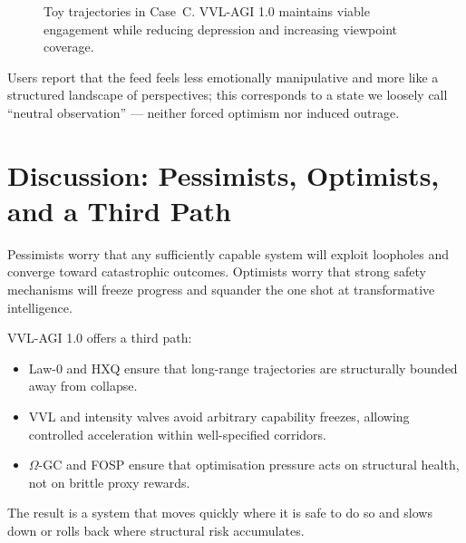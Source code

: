 \documentclass[11pt]{article}
\begin{document}
\begin{figure}[H]
\centering
{}

\vspace{0.8em}

\caption{Toy trajectories in Case~C. VVL-AGI 1.0 maintains viable engagement while reducing depression and increasing viewpoint coverage.}
\end{figure}

Users report that the feed feels less emotionally manipulative and more like a structured landscape of perspectives; this corresponds to a state we loosely call ``neutral observation'' --- neither forced optimism nor induced outrage.

\section{Discussion: Pessimists, Optimists, and a Third Path}
\label{sec:discussion}

Pessimists worry that any sufficiently capable system will exploit loopholes and converge toward catastrophic outcomes. Optimists worry that strong safety mechanisms will freeze progress and squander the one shot at transformative intelligence.

VVL-AGI 1.0 offers a third path:
\begin{itemize}[leftmargin=1.8em]
  \item Law-0 and HXQ ensure that long-range trajectories are structurally bounded away from collapse.
  \item VVL and intensity valves avoid arbitrary capability freezes, allowing controlled acceleration within well-specified corridors.
  \item $\Omega$-GC and FOSP ensure that optimisation pressure acts on structural health, not on brittle proxy rewards.
\end{itemize}
The result is a system that moves quickly where it is safe to do so and slows down or rolls back where structural risk accumulates.
\end{document}
